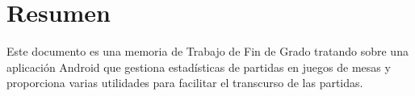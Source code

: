 \chapter*{Resumen}

Este documento es una memoria de Trabajo de Fin de Grado tratando sobre una aplicación Android que gestiona estadísticas de partidas en juegos de mesas y proporciona varias utilidades para facilitar el transcurso de las partidas.